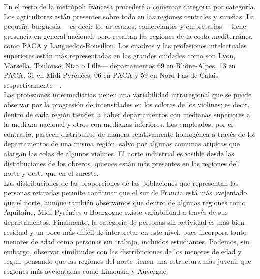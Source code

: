  En el resto de la metrópoli francesa procederé a comentar categoría por categoría. Los agricultores están presentes sobre todo en las regiones centrales y sureñas. La pequeña burguesía--- es decir los artesanos, comerciantes y empresarios--- tiene presencia en general nacional, pero resaltan las regiones de la costa mediterránea como PACA y Languedoc-Rousillon. Los cuadros y las profesiones intelectuales superiores están más representadas en las grandes ciudades como son Lyon, Marsella, Toulouse, Niza o Lille--- departamentos 69 en Rhône-Alpes, 13 en PACA, 31 en Midi-Pyrénées, 06 en PACA y 59 en Nord-Pas-de-Calais respectivamente---.\\ 
 
 Las profesiones intermediarias tienen una variabilidad intraregional que se puede observar por la progresión de intensidades en los colores de los violines; es decir, dentro de cada región tienden a haber departamentos con medianas superiores a la mediana nacional y otros con medianas inferiores. Los empleados, por el contrario, parecen distribuirse de manera relativamente homogénea a través de los departamentos de una misma región, salvo por algunas comunas atípicas que alargan las colas de algunos violines. El norte industrial es visible desde las distribuciones de los obreros, quienes están más presentes en las regiones del norte y oeste que en el sureste.\\
 
  Las distribuciones de las proporciones de las poblaciones que representan las personas retiradas permite confirmar que el sur de Francia está más avejentado que el norte, aunque también observamos que dentro de algunas regiones como Aquitaine, Midi-Pyrénées o Bourgogne existe variabilidad a través de sus departamentos. Finalmente, la categoría de personas sin actividad es más bien residual y un poco más difícil de interpretar en este nivel, pues incorpora tanto menores de edad como personas sin trabajo, incluidos estudiantes. Podemos, sin embargo, observar similitudes con las distribuciones de los menores de edad y seguir pensando que las regiones del norte tienen una estructura más juvenil que regiones más avejentadas como Limousin y Auvergne.\\


